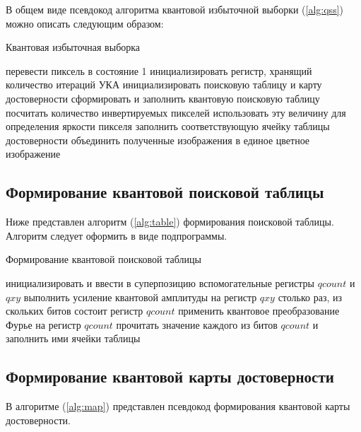В общем виде псевдокод алгоритма квантовой избыточной выборки (\ref{alg:qss}) можно описать следующим образом:

\begin{algorithm}
	\caption{Квантовая избыточная выборка}
	\label{alg:qss}
	\begin{algorithmic}[1]
				\State перевести пиксель в состояние 1
			\EndFor
			\State инициализировать регистр, хранящий количество итераций УКА
			\State инициализировать поисковую таблицу и карту достоверности
			\State сформировать и заполнить квантовую поисковую таблицу
				\State посчитать количество инвертируемых пикселей 
				\State использовать эту величину для определения яркости пикселя
				\State заполнить соответствующую ячейку таблицы достоверности
			\EndFor
		\EndFor
		\State объединить полученные изображения в единое цветное изображение
	\end{algorithmic}
\end{algorithm}

\subsection{Формирование квантовой поисковой таблицы}

Ниже представлен алгоритм (\ref{alg:table}) формирования поисковой таблицы. Алгоритм следует оформить в виде подпрограммы.

\begin{algorithm}
	\caption{Формирование квантовой поисковой таблицы}
	\label{alg:table}
	\begin{algorithmic}[1]
		\State инициализировать и ввести в суперпозицию вспомогательные регистры $qcount$ и $qxy$
		\State выполнить усиление квантовой амплитуды на регистр $qxy$ столько раз, из скольких битов состоит регистр $qcount$
		\State применить квантовое преобразование Фурье на регистр $qcount$
		\State прочитать значение каждого из битов $qcount$ и заполнить ими ячейки таблицы
	\end{algorithmic}
\end{algorithm}

\subsection{Формирование квантовой карты достоверности}

В алгоритме (\ref{alg:map}) представлен псевдокод формирования квантовой карты достоверности.

